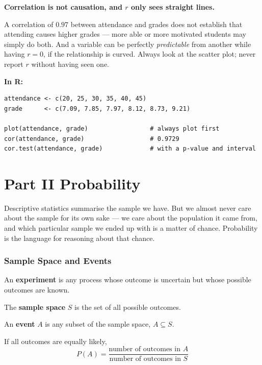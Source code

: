 \documentclass[a4paper,11pt]{article}
\newcommand{\Rc}{\textbf{\color{NavyBlue}In R:}\ }
\begin{document}
\begin{watchbox}
\textbf{Correlation is not causation, and $r$ only sees straight lines.}

A correlation of $0.97$ between attendance and grades does not establish that
attending causes higher grades --- more able or more motivated students may
simply do both. And a variable can be perfectly \emph{predictable} from another
while having $r = 0$, if the relationship is curved. Always look at the scatter
plot; never report $r$ without having seen one.
\end{watchbox}

\Rc
\begin{lstlisting}
attendance <- c(20, 25, 30, 35, 40, 45)
grade      <- c(7.09, 7.85, 7.97, 8.12, 8.73, 9.21)

plot(attendance, grade)                 # always plot first
cor(attendance, grade)                  # 0.9729
cor.test(attendance, grade)             # with a p-value and interval
\end{lstlisting}

\clearpage
\part*{Part II \quad Probability}

Descriptive statistics summarise the sample we have. But we almost never care
about the sample for its own sake --- we care about the population it came from,
and which particular sample we ended up with is a matter of chance. Probability
is the language for reasoning about that chance.

\section{Sample Space and Events}

\begin{keybox}
An \textbf{experiment} is any process whose outcome is uncertain but whose
possible outcomes are known.

The \textbf{sample space} $S$ is the set of all possible outcomes.

An \textbf{event} $A$ is any subset of the sample space, $A \subseteq S$.

If all outcomes are equally likely,
\[ P(A) = \frac{\text{number of outcomes in } A}{\text{number of outcomes in } S} \]
\end{keybox}
\end{document}
